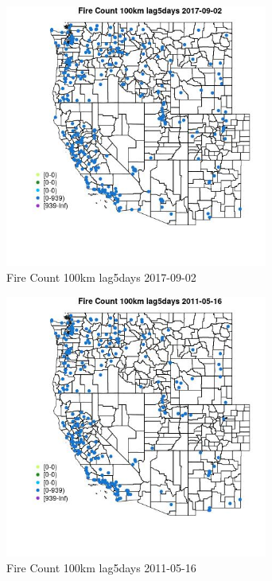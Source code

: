 \begin{figure} 
\centering  
\includegraphics[width=0.77\textwidth]{Code_Outputs/Report_ML_input_PM25_Step4_part_e_de_duplicated_aves_compiled_2019-05-20wNAs_MapObsFire_Count_100km_lag5days2017-09-02.jpg} 
\caption{\label{fig:Report_ML_input_PM25_Step4_part_e_de_duplicated_aves_compiled_2019-05-20wNAsMapObsFire_Count_100km_lag5days2017-09-02}Fire Count 100km lag5days 2017-09-02} 
\end{figure} 
 

\begin{figure} 
\centering  
\includegraphics[width=0.77\textwidth]{Code_Outputs/Report_ML_input_PM25_Step4_part_e_de_duplicated_aves_compiled_2019-05-20wNAs_MapObsFire_Count_100km_lag5days2011-05-16.jpg} 
\caption{\label{fig:Report_ML_input_PM25_Step4_part_e_de_duplicated_aves_compiled_2019-05-20wNAsMapObsFire_Count_100km_lag5days2011-05-16}Fire Count 100km lag5days 2011-05-16} 
\end{figure} 
 

